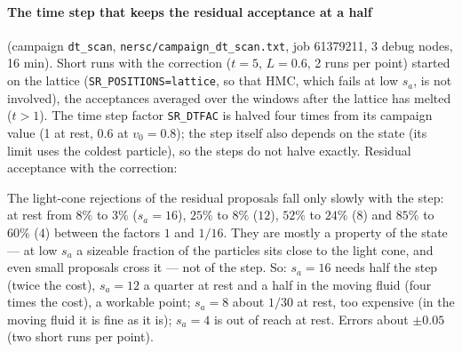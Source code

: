\documentclass[11pt,aps,preprint,nofootinbib,superscriptaddress,tightenlines]{revtex4-2}
\let\oldparagraph\paragraph
\renewcommand{\paragraph}{\par\bigskip\oldparagraph}
\begin{document}
\paragraph{The time step that keeps the residual acceptance at a half} (campaign \texttt{dt\_scan}, \texttt{nersc/campaign\_dt\_scan.txt}, job 61379211,
3 debug nodes, 16 min).  Short runs with the correction ($t=5$, $L=0.6$, 2 runs per point) started on the lattice (\texttt{SR\_POSITIONS=lattice}, so that
HMC, which fails at low $s_a$, is not involved), the acceptances averaged over the windows after the lattice has melted ($t>1$).  The time step
factor \texttt{SR\_DTFAC} is halved four times from its campaign value (1 at rest, $0.6$ at $v_0=0.8$); the step itself also depends on the state (its
limit uses the coldest particle), so the steps do not halve exactly.  Residual acceptance with the correction:
\begin{center}
\end{center}
The light-cone rejections of the residual proposals fall only slowly with the step: at rest from $8\%$ to $3\%$ ($s_a=16$), $25\%$ to $8\%$ ($12$), $52\%$ to $24\%$
($8$) and $85\%$ to $60\%$ ($4$) between the factors $1$ and $1/16$.  They are mostly a property of the state --- at low $s_a$ a sizeable fraction of the
particles sits close to the light cone, and even small proposals cross it --- not of the step.  So: $s_a=16$ needs half the step (twice the cost),
$s_a=12$ a quarter at rest and a half in the moving fluid (four times the cost), a workable point; $s_a=8$ about $1/30$ at rest, too expensive (in the
moving fluid it is fine as it is); $s_a=4$ is out of reach at rest.  Errors about $\pm0.05$ (two short runs per point).
\end{document}
